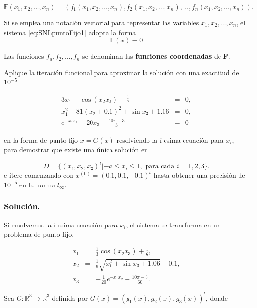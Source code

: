 \[\mathbb{F}(x_1,x_2,\dots,x_n) = \left(f_1(x_1,x_2,\dots,x_n),f_2(x_1,x_2,\dots,x_n),\dots,f_n(x_1,x_2,\dots,x_n)\right).\]

Si se emplea una notación vectorial para representar las variables $x_1,x_2,\dots,x_n$, el sistema \ref{eq:SNLpuntoFijo1} adopta la forma
\begin{equation}
	\mathbb{F}(x) = 0
\end{equation}

Las funciones $f_a,f_2,\dots,f_n$ se denominan las \textbf{funciones coordenadas} de \textbf{F}.

\begin{exerciseT}
Aplique la iteración funcional para aproximar la solución con una exactitud de $10^{-5}$.

\[
  \begin{array}{rcl}
    3x_1 - \cos (x_2x_3) - \frac{1}{2} & = & 0,\\
    x_1^2 - 81(x_2 + 0.1)^2 + \sin x_3 + 1.06 & = & 0,\\
    e^{-x_1x_2} + 20x_3 + \frac{10\pi - 3}{3} & = & 0
  \end{array}
\]

en la forma de punto fijo $x=G(x)$ resolviendo la í-esima ecuación para $x_i$, para demostrar que existe una única solución en

$$D=\{(x_1,x_2,x_3)^t | -a\leq x_i\leq 1, \mbox{ para cada } i=1,2,3\}.$$
e itere comenzando con $x^{(0)}=(0.1,0.1,-0.1)^t$ hasta obtener una precisión de $10^{-5}$ en la norma $l_\infty$.

\subsubsection*{Solución.}
Si resolvemos la í-esima ecuación para $x_i$, el sistema se transforma en un problema de punto fijo.

\begin{equation}
  \begin{array}{ccl}
    x_1 & = & \frac{1}{3}\cos (x_2x_3) + \frac{1}{6},\\
    x_2 & = & \frac{1}{9}\sqrt{x_1^2 + \sin x_3 + 1.06} - 0.1,\\ 
    x_3 & = & -\frac{1}{20}e^{-x_1x_2}-\frac{10\pi-3}{60}.
  \end{array}
  \label{eq:exSNLpuntoFijo1}
\end{equation}

Sea $G:\mathbb{R}^3\rightarrow\mathbb{R}^3$ definida por $G(x) = (g_1(x),g_2(x),g_3(x))^t$, donde


\end{exerciseT}
